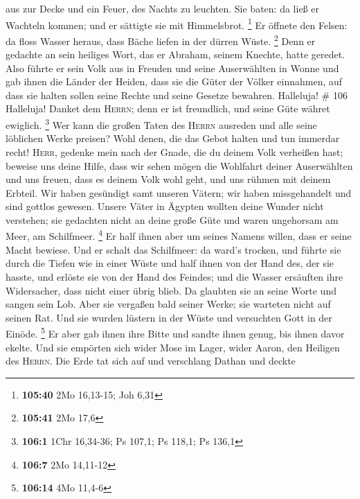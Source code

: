 aus zur Decke und ein Feuer, des Nachts zu leuchten.  Sie
baten: da ließ er Wachteln kommen; und er sättigte sie mit Himmelsbrot.
\footnote{\textbf{105:40} 2Mo 16,13-15; Joh 6,31}  Er
öffnete den Felsen: da floss Wasser heraus, dass Bäche liefen in der
dürren Wüste. \footnote{\textbf{105:41} 2Mo 17,6}  Denn
er gedachte an sein heiliges Wort, das er Abraham, seinem Knechte, hatte
geredet.  Also führte er sein Volk aus in Freuden und
seine Auserwählten in Wonne  und gab ihnen die Länder der
Heiden, dass sie die Güter der Völker einnahmen,  auf
dass sie halten sollen seine Rechte und seine Gesetze bewahren.
Halleluja! \# 106  Halleluja! Danket dem \textsc{Herrn};
denn er ist freundlich, und seine Güte währet ewiglich. \footnote{\textbf{106:1}
  1Chr 16,34-36; Ps 107,1; Ps 118,1; Ps 136,1}  Wer kann
die großen Taten des \textsc{Herrn} ausreden und alle seine löblichen
Werke preisen?  Wohl denen, die das Gebot halten und tun
immerdar recht!  \textsc{Herr}, gedenke mein nach der
Gnade, die du deinem Volk verheißen hast; beweise uns deine Hilfe,
 dass wir sehen mögen die Wohlfahrt deiner Auserwählten
und uns freuen, dass es deinem Volk wohl geht, und uns rühmen mit deinem
Erbteil.  Wir haben gesündigt samt unseren Vätern; wir
haben missgehandelt und sind gottlos gewesen.  Unsere
Väter in Ägypten wollten deine Wunder nicht verstehen; sie gedachten
nicht an deine große Güte und waren ungehorsam am Meer, am Schilfmeer.
\footnote{\textbf{106:7} 2Mo 14,11-12}  Er half ihnen aber
um seines Namens willen, dass er seine Macht bewiese.  Und
er schalt das Schilfmeer: da ward's trocken, und führte sie durch die
Tiefen wie in einer Wüste  und half ihnen von der Hand
des, der sie hasste, und erlöste sie von der Hand des Feindes;
 und die Wasser ersäuften ihre Widersacher, dass nicht
einer übrig blieb.  Da glaubten sie an seine Worte und
sangen sein Lob.  Aber sie vergaßen bald seiner Werke;
sie warteten nicht auf seinen Rat.  Und sie wurden
lüstern in der Wüste und versuchten Gott in der Einöde. \footnote{\textbf{106:14}
  4Mo 11,4-6}  Er aber gab ihnen ihre Bitte und sandte
ihnen genug, bis ihnen davor ekelte.  Und sie empörten
sich wider Mose im Lager, wider Aaron, den Heiligen des \textsc{Herrn}.
 Die Erde tat sich auf und verschlang Dathan und deckte
